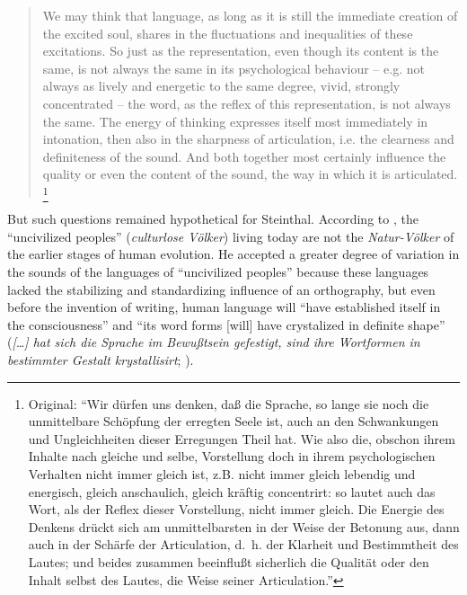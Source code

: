 \documentclass[output=paper]{langscibook}
\begin{document}
\begin{quotation}
We may think that language, as long as it is still the immediate creation of the excited soul, shares in the fluctuations and inequalities of these excitations. So just as the representation, even though its content is the same, is not always the same in its psychological behaviour – e.g. not always as lively and energetic to the same degree, vivid, strongly concentrated – the word, as the reflex of this representation, is not always the same. The energy of thinking expresses itself most immediately in intonation, then also in the sharpness of articulation, i.e. the clearness and definiteness of the sound. And both together most certainly influence the quality or even the content of the sound, the way in which it is articulated. \citep[3-4]{Steinthal1867}\footnote{Original: ``Wir dürfen uns denken, daß die Sprache, so lange sie noch die unmittelbare Schöpfung der erregten Seele ist, auch an den Schwankungen und Ungleichheiten dieser Erregungen Theil hat. Wie also die, obschon ihrem Inhalte nach gleiche und selbe, Vorstellung doch in ihrem psychologischen Verhalten nicht immer gleich ist, z.B. nicht immer gleich lebendig und energisch, gleich anschaulich, gleich kräftig concentrirt: so lautet auch das Wort, als der Reflex dieser Vorstellung, nicht immer gleich. Die Energie des Denkens drückt sich am unmittelbarsten in der Weise der Betonung aus, dann auch in der Schärfe der Articulation, d.~h. der Klarheit und Bestimmtheit des Lautes; und beides zusammen beeinflußt sicherlich die Qualität oder den Inhalt selbst des Lautes, die Weise seiner Articulation.''}
\end{quotation}

But such questions remained hypothetical for Steinthal. According to \citet[3-4]{Steinthal1867}, the ``uncivilized peoples'' (\emph{culturlose Völker}) living today are not the \emph{Natur-Völker} of the earlier stages of human evolution. He accepted a greater degree of variation in the sounds of the languages of ``uncivilized peoples'' because these languages lacked the stabilizing and standardizing influence of an orthography, but even before the invention of writing, human language will ``have established itself in the consciousness'' and ``its word forms [will] have crystalized in definite shape'' (\emph{[…] hat sich die Sprache im Bewußtsein gefestigt, sind ihre Wortformen in bestimmter Gestalt krystallisirt}; \citealt[4-5]{Steinthal1867}). 
\end{document}

